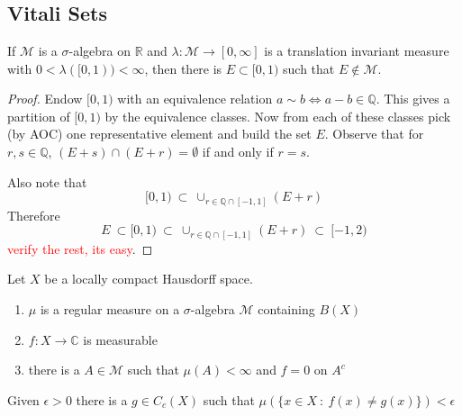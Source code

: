 
\chapter{}

\section{Vitali Sets}

\begin{theorem}
  If $\mathcal{M}$ is a $\sigma$-algebra on $\mathbb{R}$ and
  $\lambda: \mathcal{M} \to [0, \infty]$ is a translation invariant
  measure with $0 < \lambda([0, 1)) < \infty$, then there is $ E
  \subset [0, 1)$ such that $E \notin \mathcal{M}$.
\end{theorem}
\begin{proof}
  Endow $[0, 1)$ with an equivalence relation $a \sim b \iff a-b \in
  \mathbb{Q}$. This gives a partition of $[0, 1)$ by the equivalence classes.
  Now from each of these classes pick (by AOC) one representative element and
  build the set $E$. Observe that for $r, s \in \mathbb{Q}$, $(E + s)
  \cap (E + r) = \emptyset$ if and only if $r = s$.

  Also note that  \[
    [0, 1) \ \subset \ \cup_{r \in \mathbb{Q} \cap [-1, 1]}(E+r)
  \]
  Therefore \[
    E \ \subset [0, 1) \ \subset  \ \cup_{r \in \mathbb{Q} \cap [-1, 1]}(E+r)
    \ \subset \ [-1, 2)
  \]
  \textcolor{red}{verify the rest, its easy}.
\end{proof}

\begin{theorem}
  Let $X$ be a locally compact Hausdorff space.
  \begin{enumerate}[label=(\arabic*)]
    \item $\mu$ is a regular measure on a $\sigma$-algebra
      $\mathcal{M}$ containing $B(X)$
    \item $f: X \to \mathbb{C}$ is measurable
    \item there is a $A \in \mathcal{M}$ such that $\mu(A) < \infty$
      and $f = 0$ on $A^c$
  \end{enumerate}
  Given $\epsilon> 0$ there is a $g \in C_c(X)$ such that $
  \mu(\{ x \in X  \ : \  f(x) \neq g(x) \}) < \epsilon$
\end{theorem}


